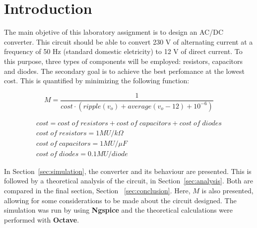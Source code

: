 \newpage

\section{Introduction}
\label{sec:introduction}


The main objetive of this laboratory assignment is to design an AC/DC converter. This circuit should be able to convert 230 V of alternating current at a frequency of 50 Hz (standard domestic eletricity) to 12 V of direct current. To this purpose, three types of components will be employed: resistors, capacitors and diodes. The secondary goal is to achieve the best perfomance at the lowest cost. This is quantified by minimizing the following function:

\begin{equation}
  M = \frac{1}{cost \cdot (ripple(v_o) + average(v_o-12) + 10^{-6})}
\end{equation}

\begin{gather*}
  cost = cost\;of\;resistors + cost\;of\;capacitors + cost\;of\;diodes \\
  cost\;of\;resistors = 1 MU/k\Omega \\
  cost\;of\;capacitors = 1 MU/\mu F \\
  cost\;of\;diodes = 0.1 MU/diode
\end{gather*}

In Section~\ref{sec:simulation}, the converter and its behaviour are presented. This is followed by a theoretical analysis of the circuit, in Section~\ref{sec:analysis}. Both are compared in the final section, Section ~\ref{sec:conclusion}. Here, $M$ is also presented, allowing for some considerations to be made about the circuit designed. The simulation was run by using {\bf Ngspice} and the theoretical calculations were performed with {\bf Octave}.
